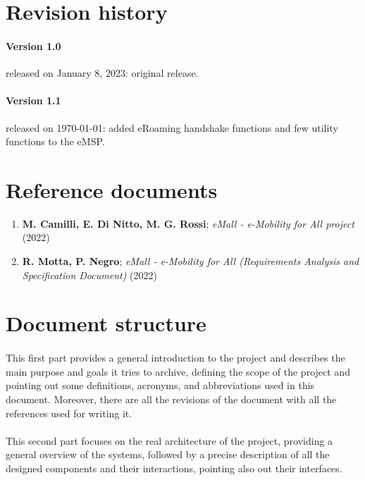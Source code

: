 \section{Revision history}

\paragraph{Version 1.0} released on January 8, 2023: original release.
\paragraph{Version 1.1} released on \today: added eRoaming handshake functions and few utility functions to the eMSP.

\section{Reference documents}

\begin{enumerate}
    \item \textbf{M. Camilli, E. Di Nitto, M. G. Rossi}; \textit{eMall - e-Mobility for All project} (2022)
    \item \textbf{R. Motta, P. Negro}; \textit{eMall - e-Mobility for All (Requirements Analysis and Specification Document)} (2022)
\end{enumerate}

\section{Document structure}

\paragraph{} This first part provides a general introduction to the project and describes the main purpose and goals it tries to archive, defining the scope of the project and pointing out some definitions, acronyms, and abbreviations used in this document. Moreover, there are all the revisions of the document with all the references used for writing it.

\paragraph{} This second part focuses on the real architecture of the project, providing a general overview of the systems, followed by a precise description of all the designed components and their interactions, pointing also out their interfaces.

